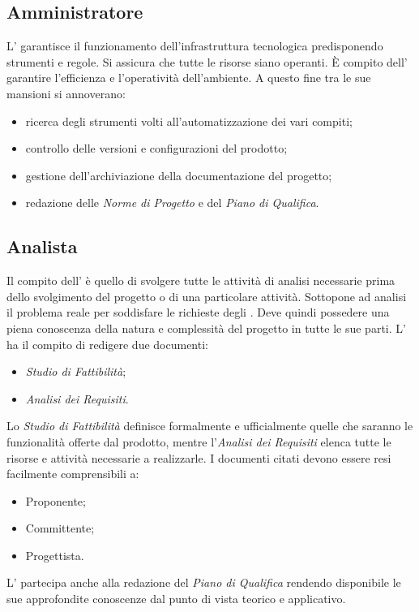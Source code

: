 \subsection{Amministratore}
L'\Amministratore{} garantisce il funzionamento dell'infrastruttura tecnologica predisponendo strumenti e regole. Si assicura che tutte le risorse siano operanti. \`{E} compito dell'\Amministratore{} garantire l'efficienza e l'operatività dell'ambiente. A questo fine tra le sue mansioni si annoverano:
\begin{itemize}
	\item ricerca degli strumenti volti all'automatizzazione dei vari compiti;
	\item controllo delle versioni e configurazioni del prodotto;
	\item gestione dell'archiviazione della documentazione del progetto;
	\item redazione delle \textit{Norme di Progetto} e del \textit{Piano di Qualifica}.
\end{itemize}

\subsection{Analista}
Il compito dell'\Analista{} è quello di svolgere tutte le attività di analisi necessarie prima dello svolgimento del progetto o di una particolare attività. Sottopone ad analisi il problema reale per soddisfare le richieste degli . Deve quindi possedere una piena conoscenza della natura e complessità del progetto in tutte le sue parti. L'\Analista{} ha il compito di redigere due documenti:
\begin{itemize}
	\item \textit{Studio di Fattibilità};
	\item \textit{Analisi dei Requisiti}.
\end{itemize}
Lo \textit{Studio di Fattibilità} definisce formalmente e ufficialmente quelle che saranno le funzionalità offerte dal prodotto, mentre l'\textit{Analisi dei Requisiti} elenca tutte le risorse e attività necessarie a realizzarle. I documenti citati devono essere resi facilmente comprensibili a:
\begin{itemize}
	\item Proponente;
	\item Committente;
	\item Progettista.
\end{itemize}
L'\Analista{} partecipa anche alla redazione del \textit{Piano di Qualifica} rendendo disponibile le sue approfondite conoscenze dal punto di vista teorico e applicativo.


